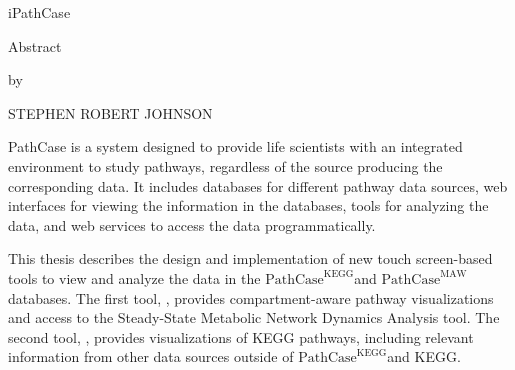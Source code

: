 \newcommand{\pathcasekegg}{$\mathrm{PathCase}^\mathrm{KEGG}$}
\newcommand{\pathcasemaw}{$\mathrm{PathCase}^\mathrm{MAW}$}
\newcommand{\pathcasesb}{$\mathrm{PathCase}^\mathrm{SB}$}
\newcommand{\boldpathcasekegg}{$\mathbf{PathCase}^\mathbf{KEGG}$}
\newcommand{\boldpathcasemaw}{$\mathbf{PathCase}^\mathbf{MAW}$}

\begin{center}
    iPathCase

    Abstract

    by

    STEPHEN ROBERT JOHNSON
\end{center}

PathCase is a system designed to provide life scientists with an integrated
environment to study pathways, regardless of the source producing the
corresponding data. It includes databases for different pathway data sources,
web interfaces for viewing the information in the databases, tools for analyzing
the data, and web services to access the data programmatically.

This thesis describes the design and implementation of new touch screen-based
tools to view and analyze the data in the \pathcasekegg and \pathcasemaw
databases. The first tool, \mawapp, provides compartment-aware pathway
visualizations and access to the Steady-State Metabolic Network Dynamics
Analysis tool. The second tool, \keggapp, provides visualizations of KEGG
pathways, including relevant information from other data sources outside of
\pathcasekegg and KEGG.
